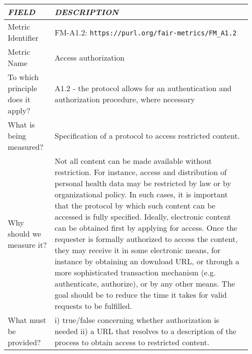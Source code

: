 \documentclass[english]{article}
\begin{document}
\begin{longtable}{|p{5cm}|p{9cm}|}


\hline
\emph{FIELD} & \emph{DESCRIPTION} \\
\hline
Metric Identifier &   FM-A1.2: \verb"https://purl.org/fair-metrics/FM_A1.2"
 \\


\hline
Metric Name &   



Access authorization



 \\



\hline
To which principle does it apply? &   


A1.2 - the protocol allows for an authentication and authorization procedure, where necessary

\\



\hline
What is being measured? & 

Specification of a protocol to access restricted content.


\\



\hline
Why should we measure it? & 


Not all content can be made available without restriction. For instance, access and distribution of personal health data may be restricted by law or by organizational policy. In such cases, it is important that the protocol by which such content can be accessed is fully specified. Ideally, electronic content can be obtained first by applying for access. Once the requester is formally authorized to access the content, they may receive it in some electronic means, for instance by obtaining an download URL, or through a more sophisticated transaction mechanism (e.g. authenticate, authorize), or by any other means. The goal should be to reduce the time it takes for valid requests to be fulfilled. 
  
\\



\hline
What must be provided? &  


i) true/false concerning whether authorization is needed\newline 
ii) a URL that resolves to a description of the process to obtain access to restricted content.\newline 





\end{longtable}
\end{document}
